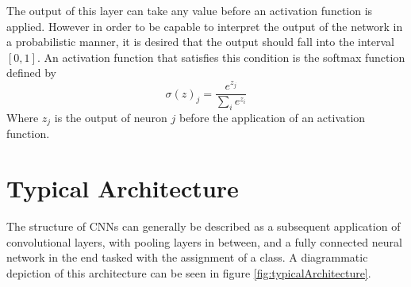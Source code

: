 The output of this layer can take any value before an activation function is applied. However in order to be capable to interpret the output of the network in a probabilistic manner, it is desired that the output should fall into the interval $[0,1]$. An activation function that satisfies this condition is the softmax function defined by
\begin{equation}
\sigma(z)_j = \frac{e^{z_j}}{\sum_i e^{z_i}}
\end{equation}
Where $z_j$ is the output of neuron $j$ before the application of an activation function. 



\section{Typical Architecture}

The structure of CNNs can generally be described as a subsequent application of convolutional layers, with pooling layers in between, and a fully connected neural network in the end tasked with the assignment of a class. A diagrammatic depiction of this architecture can be seen in figure \ref{fig:typicalArchitecture}.

